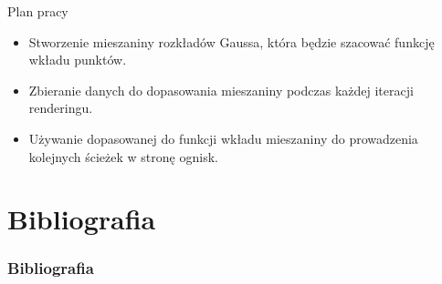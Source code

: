 \documentclass{beamer}
\begin{document}
\begin{frame}{Plan pracy}
    \begin{itemize}
        \item Stworzenie mieszaniny rozkładów Gaussa, która będzie szacować funkcję wkładu punktów.
        \item Zbieranie danych do dopasowania mieszaniny podczas każdej iteracji renderingu.
        \item Używanie dopasowanej do funkcji wkładu mieszaniny do prowadzenia kolejnych ścieżek w stronę ognisk.
    \end{itemize}
\end{frame}

\section{Bibliografia}
\begin{frame}
    \frametitle{Bibliografia}
    \nocite{*}
    \printbibliography
\end{frame}
\end{document}
